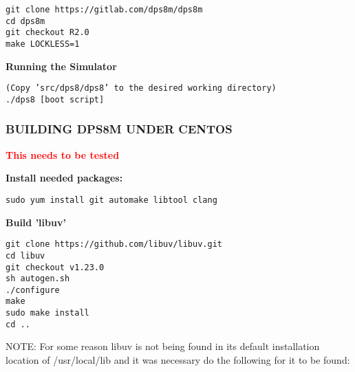 \begin{adjustwidth}{5ex}{1ex}
    \texttt{git clone https://gitlab.com/dps8m/dps8m} \\
    \texttt{cd dps8m} \\
    \texttt{git checkout R2.0} \\
    \texttt{make LOCKLESS=1} \\
\end{adjustwidth}  

\textbf{Running the Simulator}

\begin{adjustwidth}{5ex}{1ex}
    \texttt{(Copy 'src/dps8/dps8' to the desired working directory)} \\
    \texttt{./dps8 [boot script]} \\
\end{adjustwidth}  

\newpage

\subsubsection[Building dps8m under CentOS]{BUILDING DPS8M UNDER CENTOS}

\textbf{\textcolor{red}{This needs to be tested}}

\textbf{Install needed packages:}

\begin{adjustwidth}{5ex}{1ex}
	\texttt{sudo yum install git automake libtool clang} \\
\end{adjustwidth}  

\textbf{Build 'libuv'}

\begin{adjustwidth}{5ex}{1ex}
    \texttt{git clone https://github.com/libuv/libuv.git} \\
    \texttt{cd libuv} \\
    \texttt{git checkout v1.23.0} \\
    \texttt{sh autogen.sh} \\
    \texttt{./configure} \\
    \texttt{make} \\
    \texttt{sudo make install} \\
    \texttt{cd ..} \\
\end{adjustwidth}  

NOTE: For some reason libuv is not being found in its default installation location of /usr/local/lib and it was necessary do the following for it to be found:

